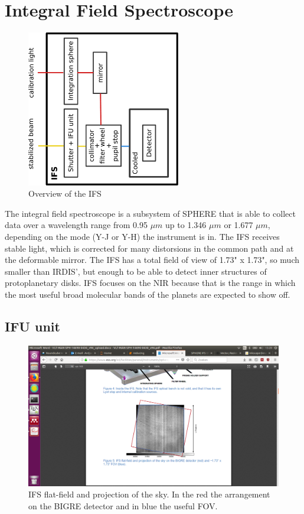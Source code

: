 \documentclass[twoside,single]{lion-msc}
\begin{document}
\section{Integral Field Spectroscope}
\begin{figure}[htbp]
\centering 
\includegraphics[trim={13cm 5cm 10cm 7cm},clip,width = 0.6\textwidth]{overviewIFS}
\caption{Overview of the IFS\cite{Observatory2007}} 
\label{}
\end{figure}

The integral field spectroscope is a subsystem of SPHERE that is able to collect data over a wavelength range from 0.95 $\mu m$ up to 1.346 $\mu m$ or 1.677 $\mu m$, depending on the mode (Y-J or Y-H) the instrument is in. The IFS receives stable light, which is corrected for many distorsions in the common path and at the deformable mirror. The IFS has a total field of view of 1.73" x 1.73", so much smaller than IRDIS', but enough to be able to detect inner structures of protoplanetary disks. IFS focuses on the NIR because that is the range in which the most useful broad molecular bands of the planets are expected to show off.

\subsection{IFU unit}
\begin{figure}
\centering 
\includegraphics[trim={15cm 5.5cm 10cm 9.5cm},clip,scale = 0.47]{biggre}
\caption{IFS flat-field and projection of the sky. In the red the arrangement on the BIGRE detector and in blue the useful FOV. \citep{Observatory2007}} 
\label{fig:bigre}
\end{figure}
\end{document}
